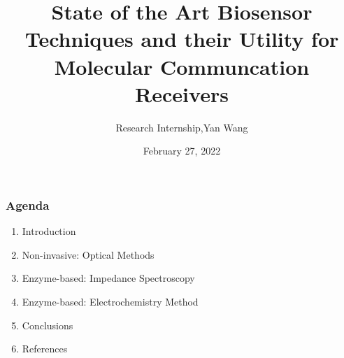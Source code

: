 \documentclass[fontsize=11pt,aspectratio=169,t,fleqn]{beamer}
\begin{document}
\abovedisplayskip=5pt
\belowdisplayskip=0pt
\abovedisplayshortskip=0pt
\belowdisplayshortskip=2pt

\author[]{Research Internship,Yan Wang}
\title[Final presentation]{State of the Art Biosensor Techniques and their Utility for Molecular Communcation Receivers}
\date{February 27, 2022}

\maketitle

\begin{frame}
    \frametitle{\textbf{Agenda}}
   
    \begin{enumerate}
        \itemsep=15pt
        \item  Introduction
        \item  Non-invasive: Optical Methods
        \item Enzyme-based: Impedance Spectroscopy
        \item Enzyme-based: Electrochemistry Method 
        \item Conclusions
        \item References
    \end{enumerate}
\end{frame}
\end{document}
